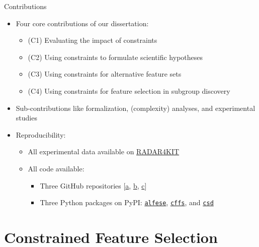 \documentclass[en, navbarinline, handout]{sdqbeamer}
\begin{document}
\begin{frame}[t]{Contributions}
	\label{slide:contributions}
	\begin{itemize}
		\item Four core contributions of our dissertation:
		\begin{itemize}
			\item (C1) Evaluating the impact of constraints \cite{bach2022empirical}
			\item (C2) Using constraints to formulate scientific hypotheses \cite{bach2022empirical}
			\item (C3) Using constraints for alternative feature sets \cite{bach2023finding, bach2024alternative}
			\item (C4) Using constraints for feature selection in subgroup discovery \cite{bach2025subgroup, bach2024using}
		\end{itemize}
		\item Sub-contributions like formalization, (complexity) analyses, and experimental studies
		\pause
		\vspace{\baselineskip}
		\item Reproducibility:
		\begin{itemize}
			\item All experimental data available on \href{https://doi.org/10.35097/4kjyeg0z2bxmr6eh}{RADAR4KIT}
			\item All code available:
			\begin{itemize}
				\item Three GitHub repositories [\href{https://github.com/Jakob-Bach/Constrained-Filter-Feature-Selection}{a}, \href{https://github.com/Jakob-Bach/Alternative-Feature-Selection}{b}, \href{https://github.com/Jakob-Bach/Constrained-Subgroup-Discovery}{c}]
				\item Three Python packages on PyPI: \href{https://pypi.org/project/alfese/}{\texttt{alfese}}, \href{https://pypi.org/project/cffs/}{\texttt{cffs}}, and \href{https://pypi.org/project/csd/}{\texttt{csd}}
			\end{itemize}
		\end{itemize}
	\end{itemize}
\end{frame}

\section{Constrained Feature Selection}
\end{document}
